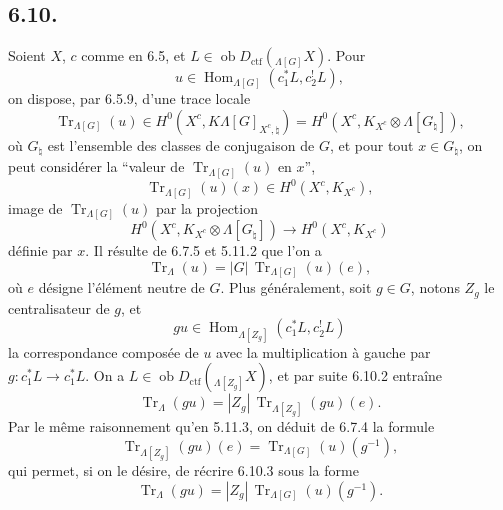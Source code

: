 \documentclass[11pt]{article}
\DeclareMathOperator{\Hom}{Hom}
\providecommand{\Tr}{\operatorname{Tr}}
\providecommand{\Tr}{\operatorname{Tr}}
\providecommand{\Ob}{\operatorname{ob}}
\providecommand{\Tr}{\operatorname{Tr}}
\providecommand{\Hom}{\operatorname{Hom}}
\providecommand{\Ob}{\operatorname{ob}}
\providecommand{\Tr}{\operatorname{Tr}}
\providecommand{\Ob}{\operatorname{Ob}}
\providecommand{\Hom}{\operatorname{Hom}}
\providecommand{\Tr}{\operatorname{Tr}}
\providecommand{\Ob}{\operatorname{ob}}
\providecommand{\Ob}{\operatorname{Ob}}
\begin{document}
\subsection*{6.10.}
Soient $X$, $c$ comme en 6.5, et $L\in\Ob D_{\mathrm{ctf}}({}_{\Lambda[G]}X)$. Pour
\[
u\in\Hom_{\Lambda[G]}(c_1^*L,c_2^!L),
\]
on dispose, par 6.5.9, d'une trace locale
\begin{equation}
\Tr_{\Lambda[G]}(u)\in
H^0(X^c,K\Lambda[G]_{X^c,\natural})
=H^0(X^c,K_{X^c}\otimes\Lambda[G_{\natural}]),
\tag{6.10.1}
\end{equation}
où $G_{\natural}$ est l'ensemble des classes de conjugaison de $G$, et pour tout $x\in G_{\natural}$, on peut considérer la ``valeur de $\Tr_{\Lambda[G]}(u)$ en $x$'',
\[
\Tr_{\Lambda[G]}(u)(x)\in H^0(X^c,K_{X^c}),
\]
image de $\Tr_{\Lambda[G]}(u)$ par la projection
\[
H^0(X^c,K_{X^c}\otimes\Lambda[G_{\natural}])
\longrightarrow H^0(X^c,K_{X^c})
\]
définie par $x$. Il résulte de 6.7.5 et 5.11.2 que l'on a
\begin{equation}
\Tr_{\Lambda}(u)=|G|\,\Tr_{\Lambda[G]}(u)(e),
\tag{6.10.2}
\end{equation}
où $e$ désigne l'élément neutre de $G$. Plus généralement, soit $g\in G$, notons $Z_g$ le centralisateur de $g$, et
\[
gu\in\Hom_{\Lambda[Z_g]}(c_1^*L,c_2^!L)
\]
la correspondance composée de $u$ avec la multiplication à gauche par $g:c_1^*L\to c_1^*L$. On a $L\in\Ob D_{\mathrm{ctf}}({}_{\Lambda[Z_g]}X)$, et par suite 6.10.2 entraîne
\begin{equation}
\Tr_{\Lambda}(gu)=|Z_g|\,\Tr_{\Lambda[Z_g]}(gu)(e).
\tag{6.10.3}
\end{equation}
Par le même raisonnement qu'en 5.11.3, on déduit de 6.7.4 la formule
\begin{equation}
\Tr_{\Lambda[Z_g]}(gu)(e)=\Tr_{\Lambda[G]}(u)(g^{-1}),
\tag{6.10.4}
\end{equation}
qui permet, si on le désire, de récrire 6.10.3 sous la forme
\begin{equation}
\Tr_{\Lambda}(gu)=|Z_g|\,\Tr_{\Lambda[G]}(u)(g^{-1}).
\tag{6.10.5}
\end{equation}
\end{document}
